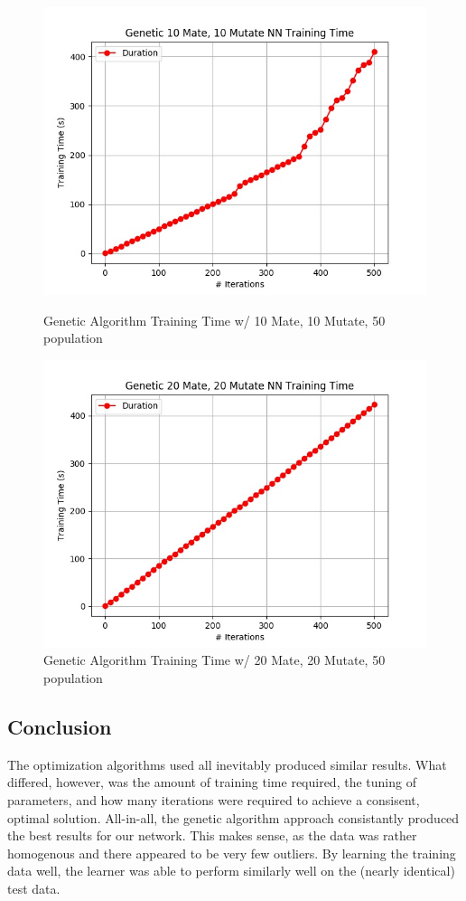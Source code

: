 \documentclass[h]{article}
\begin{document}
 \begin{figure}[H]
      \includegraphics[width=1\textwidth,keepaspectratio]{genetic_10_mate,_10_mutate_nn_time.jpg} 
      \caption*{Genetic Algorithm Training Time w/ 10 Mate, 10 Mutate, 50 population} 
   \endminipage\hfill
      \includegraphics[width=1\textwidth,keepaspectratio]{genetic_20_mate,_20_mutate_nn_time.jpg} 
      \caption*{Genetic Algorithm Training Time w/ 20 Mate, 20 Mutate, 50 population} 
   \endminipage\hfill
\end{figure}


\subsection*{ Conclusion}  
The optimization algorithms used all inevitably produced similar results.  What 
differed, however, was the amount of training time required, the tuning of 
parameters, and how many iterations were required to achieve a consisent, 
optimal solution.  All-in-all, the genetic algorithm approach consistantly produced 
the best results for our network.  This makes sense, as the data was rather 
homogenous and there appeared to be very few outliers.  By learning the training 
data well, the learner was able to perform similarly well on the (nearly identical) 
test data.
\end{document}
